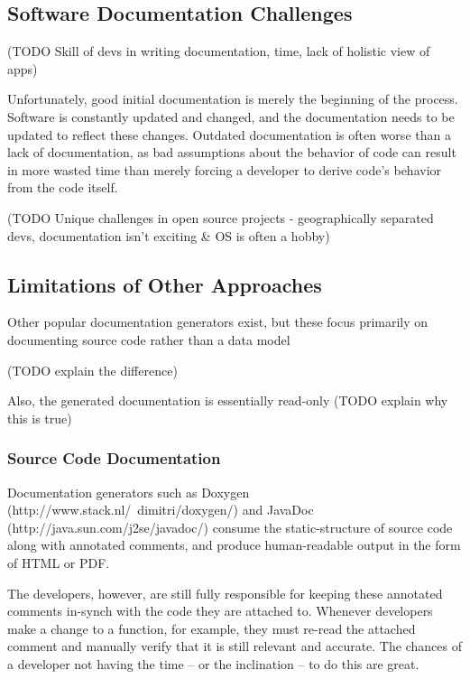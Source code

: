 \documentclass[twocolumn]{article}
\begin{document}
\subsection{Software Documentation Challenges}

(TODO Skill of devs in writing documentation, time, lack of holistic view of
apps)

Unfortunately, good initial documentation is merely the beginning of the
process.  Software is constantly updated and changed, and the documentation
needs to be updated to reflect these changes.  Outdated documentation is often
worse than a lack of documentation, as bad assumptions about the behavior of
code can result in more wasted time than merely forcing a developer to derive
code's behavior from the code itself.

(TODO Unique challenges in open source projects - geographically separated
devs, documentation isn't exciting \& OS is often a hobby)

\subsection{Limitations of Other Approaches}

Other popular documentation generators exist, but these focus primarily on
documenting source code rather than a data model

(TODO explain the difference)
 
Also, the generated documentation is essentially read-only
(TODO explain why this is true)

\subsubsection{Source Code Documentation}

Documentation generators such as Doxygen
(http://www.stack.nl/~dimitri/doxygen/) and JavaDoc
(http://java.sun.com/j2se/javadoc/) consume the static-structure of source code
along with annotated comments, and produce human-readable output in the form of
HTML or PDF.

The developers, however, are still fully responsible for keeping these
annotated comments in-synch with the code they are attached to.  Whenever
developers make a change to a function, for example, they must re-read the
attached comment and manually verify that it is still relevant and accurate. 
The chances of a developer not having the time -- or the inclination -- to do
this are great.
\end{document}
